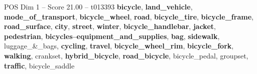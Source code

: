 \begin{textsample}{POS Dim 1 – Score 21.00 – t013393}  \label{ex:f1_pos_015}
\textbf{bicycle}, \textbf{land\_vehicle}, \textbf{mode\_of\_transport}, \textbf{bicycle\_wheel}, \textbf{road}, \textbf{bicycle\_tire}, \textbf{bicycle\_frame}, \textbf{road\_surface}, \textbf{city}, \textbf{street}, \textbf{winter}, \textbf{bicycle\_handlebar}, \textbf{jacket}, \textbf{pedestrian}, \textbf{bicycles--equipment\_and\_supplies}, \textbf{bag}, \textbf{sidewalk}, luggage\_\&\_bags, \textbf{cycling}, \textbf{travel}, \textbf{bicycle\_wheel\_rim}, \textbf{bicycle\_fork}, \textbf{walking}, crankset, \textbf{hybrid\_bicycle}, \textbf{road\_bicycle}, bicycle\_pedal, groupset, \textbf{traffic}, bicycle\_saddle

\end{textsample}
